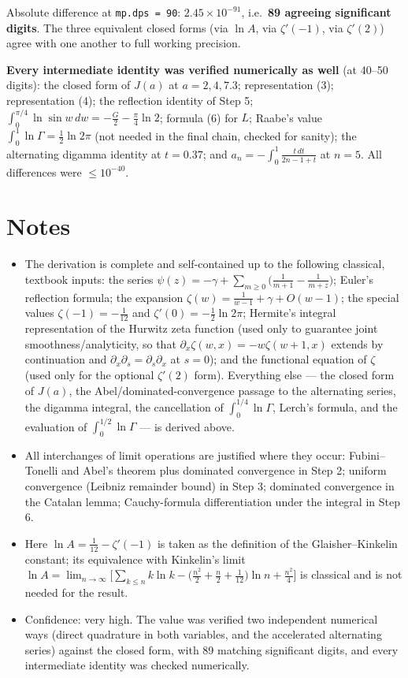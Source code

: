 \documentclass[11pt]{article}
\theoremstyle{remark}
\begin{document}
Absolute difference at \texttt{mp.dps = 90}: $2.45\times10^{-91}$, i.e.\ \textbf{89 agreeing significant digits}. The three equivalent closed forms (via $\ln A$, via $\zeta'(-1)$, via $\zeta'(2)$) agree with one another to full working precision.

\textbf{Every intermediate identity was verified numerically as well} (at 40--50 digits): the closed form of $J(a)$ at $a=2,4,7.3$; representation (3); representation (4); the reflection identity of Step 5; $\int_0^{\pi/4}\ln\sin w\,dw=-\frac G2-\frac\pi4\ln2$; formula (6) for $L$; Raabe's value $\int_0^1\ln\Gamma=\frac12\ln2\pi$ (not needed in the final chain, checked for sanity); the alternating digamma identity at $t=0.37$; and $a_n=-\int_0^1\frac{t\,dt}{2n-1+t}$ at $n=5$. All differences were $\le 10^{-40}$.

\section*{Notes}

\begin{itemize}
\item The derivation is complete and self-contained up to the following classical, textbook inputs: the series $\psi(z)=-\gamma+\sum_{m\ge0}\bigl(\frac1{m+1}-\frac1{m+z}\bigr)$; Euler's reflection formula; the expansion $\zeta(w)=\frac1{w-1}+\gamma+O(w-1)$; the special values $\zeta(-1)=-\frac1{12}$ and $\zeta'(0)=-\frac12\ln2\pi$; Hermite's integral representation of the Hurwitz zeta function (used only to guarantee joint smoothness/analyticity, so that $\partial_x\zeta(w,x)=-w\zeta(w+1,x)$ extends by continuation and $\partial_x\partial_s=\partial_s\partial_x$ at $s=0$); and the functional equation of $\zeta$ (used only for the optional $\zeta'(2)$ form). Everything else --- the closed form of $J(a)$, the Abel/dominated-convergence passage to the alternating series, the digamma integral, the cancellation of $\int_0^{1/4}\ln\Gamma$, Lerch's formula, and the evaluation of $\int_0^{1/2}\ln\Gamma$ --- is derived above.
\item All interchanges of limit operations are justified where they occur: Fubini--Tonelli and Abel's theorem plus dominated convergence in Step 2; uniform convergence (Leibniz remainder bound) in Step 3; dominated convergence in the Catalan lemma; Cauchy-formula differentiation under the integral in Step 6.
\item Here $\ln A=\frac1{12}-\zeta'(-1)$ is taken as the definition of the Glaisher--Kinkelin constant; its equivalence with Kinkelin's limit $\ln A=\lim_{n\to\infty}\bigl[\sum_{k\le n}k\ln k-\bigl(\frac{n^2}2+\frac n2+\frac1{12}\bigr)\ln n+\frac{n^{2}}4\bigr]$ is classical and is not needed for the result.
\item Confidence: very high. The value was verified two independent numerical ways (direct quadrature in both variables, and the accelerated alternating series) against the closed form, with 89 matching significant digits, and every intermediate identity was checked numerically.
\end{itemize}
\end{document}
